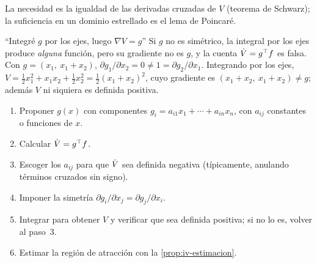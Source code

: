 La necesidad es la igualdad de las derivadas cruzadas de $V$ (teorema de Schwarz); la suficiencia en un dominio estrellado es el lema de Poincaré.

\begin{trampa}[label=tr:iv-simetria]{``Integré $g$ por los ejes, luego $\nabla V=g$''}
Si $g$ no es simétrico, la integral por los ejes produce \emph{alguna} función, pero su gradiente no es $g$, y la cuenta $\dot V=g^{\top} f$ es falsa. Con $g=(x_1,\ x_1+x_2)$, $\partial g_1/\partial x_2=0\neq1=\partial g_2/\partial x_1$. Integrando por los ejes, $V=\tfrac12x_1^2+x_1x_2+\tfrac12x_2^2=\tfrac12(x_1+x_2)^2$, cuyo gradiente es $(x_1+x_2,\ x_1+x_2)\neq g$; además $V$ ni siquiera es definida positiva.
\end{trampa}

\begin{receta}
\begin{enumerate}
  \item Proponer $g(x)$ con componentes $g_i=a_{i1}x_1+\cdots+a_{in}x_n$, con $a_{ij}$ constantes o funciones de $x$.
  \item Calcular $\dot V=g^{\top} f$.
  \item Escoger los $a_{ij}$ para que $\dot V$ sea definida negativa (típicamente, anulando términos cruzados sin signo).
  \item Imponer la simetría $\partial g_i/\partial x_j=\partial g_j/\partial x_i$.
  \item Integrar para obtener $V$ y verificar que sea definida positiva; si no lo es, volver al paso~3.
  \item Estimar la región de atracción con la \cref{prop:iv-estimacion}.
\end{enumerate}
\end{receta}

